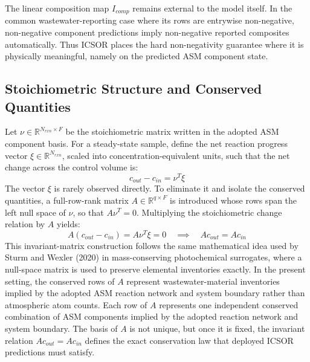 \documentclass[a4paper,fleqn]{cas-sc}
\newenvironment{revblock}{\begingroup\color{revDefault}}{\endgroup}
\newenvironment{revblockr22}{\begingroup\color{revRtwoTwo}}{\endgroup}
\begin{document}
\begin{revblock}
The linear composition map $I_{comp}$ remains external to the model itself. In the common wastewater-reporting case where its rows are entrywise non-negative, non-negative component predictions imply non-negative reported composites automatically. Thus ICSOR places the hard non-negativity guarantee where it is physically meaningful, namely on the predicted ASM component state.

\begin{revblockr22}
\subsection{Stoichiometric Structure and Conserved Quantities}

Let $\nu \in \mathbb{R}^{N_{rxn} \times F}$ be the stoichiometric matrix written in the adopted ASM component basis. For a steady-state sample, define the net reaction progress vector $\xi \in \mathbb{R}^{N_{rxn}}$, scaled into concentration-equivalent units, such that the net change across the control volume is:
\begin{equation}
\label{eq:stoichiometric-change}
 c_{out} - c_{in} = \nu^T \xi
\end{equation}
The vector $\xi$ is rarely observed directly. To eliminate it and isolate the conserved quantities, a full-row-rank matrix $A \in \mathbb{R}^{q \times F}$ is introduced whose rows span the left null space of $\nu$, so that $A\nu^T = 0$. Multiplying the stoichiometric change relation by $A$ yields:
\begin{equation}
\label{eq:invariant-conservation}
 A(c_{out} - c_{in}) = A \nu^T \xi = 0 \quad \implies \quad A c_{out} = A c_{in}
\end{equation}
This invariant-matrix construction follows the same mathematical idea used by Sturm and Wexler (2020) in mass-conserving photochemical surrogates, where a null-space matrix is used to preserve elemental inventories exactly. In the present setting, the conserved rows of $A$ represent wastewater-material inventories implied by the adopted ASM reaction network and system boundary rather than atmospheric atom counts.
Each row of $A$ represents one independent conserved combination of ASM components implied by the adopted reaction network and system boundary. The basis of $A$ is not unique, but once it is fixed, the invariant relation $Ac_{out} = Ac_{in}$ defines the exact conservation law that deployed ICSOR predictions must satisfy.
\end{revblockr22}


\end{revblock}
\end{document}
